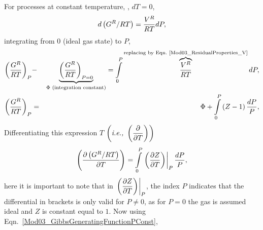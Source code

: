      For processes at constant temperature, \ie, $dT=0$,
          \begin{displaymath}
              d\left(G^{R}/RT\right) = \frc{V^{R}}{RT}dP,
          \end{displaymath}
          integrating from $0$ (ideal gas state) to $P$,
          \begin{eqnarray}
              \left(\frc{G^{R}}{RT}\right)_{P} &-&  \underbrace{\left(\frc{G^{R}}{RT}\right)_{P=0}}_{\Phi \text{ (integration constant)}} =  \int\limits_{0}^{P}\overbrace{\frc{V^{R}}{RT}}^{\text{replacing by Eqn.~\ref{Mod03_ResidualProperties_V}}}dP, \nonumber \\
              \left(\frc{G^{R}}{RT}\right)_{P} &=& \Phi + \int\limits_{0}^{P}\left(Z-1\right)\frc{dP}{P},\label{Mod03_ResidualProperties_GeneratingGibbsFunction2}
          \end{eqnarray}
          Differentiating this expression \wrt $T$ $\left(\text{\ie }\Partial[]{T}{}\right)$ 
          \begin{displaymath}
              \Partial[\left(G^{R}/RT\right)]{T}{} = \int\limits_{0}^{P} \left.\Partial[Z]{T}{}\right|_{P}\frc{dP}{P},
          \end{displaymath}
          here it is important to note that in $\left.\Partial[Z]{T}{}\right|_{P}$, the index $P$ indicates that the differential in brackets is only valid for $P\ne0$, as for $P=0$ the gas is assumed ideal and $Z$ is constant equal to $1$. Now using Eqn.~\ref{Mod03_GibbsGeneratingFunctionPConst},
